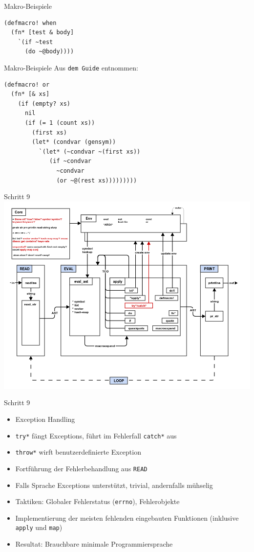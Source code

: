 \documentclass[presentation]{beamer}
\begin{document}
\begin{frame}[fragile,label=sec-3-26]{Makro-Beispiele}
 \begin{verbatim}
(defmacro! when
  (fn* [test & body]
    `(if ~test
      (do ~@body))))
\end{verbatim}
\end{frame}

\begin{frame}[fragile,label=sec-3-27]{Makro-Beispiele}
 Aus \texttt{dem Guide} entnommen:

\begin{verbatim}
(defmacro! or
  (fn* [& xs]
    (if (empty? xs)
      nil
      (if (= 1 (count xs))
        (first xs)
        (let* (condvar (gensym))
          `(let* (~condvar ~(first xs))
             (if ~condvar
               ~condvar
               (or ~@(rest xs)))))))))
\end{verbatim}
\end{frame}

\begin{frame}[label=sec-3-28]{Schritt 9}
\includegraphics[width=.9\linewidth]{./images/step9_try.png}
\end{frame}

\begin{frame}[fragile,label=sec-3-29]{Schritt 9}
 \begin{itemize}
\item Exception Handling
\item \texttt{try*} fängt Exceptions, führt im Fehlerfall \texttt{catch*} aus
\item \texttt{throw*} wirft benutzerdefinierte Exception
\item Fortführung der Fehlerbehandlung aus \texttt{READ}
\item Falls Sprache Exceptions unterstützt, trivial, andernfalls mühselig
\item Taktiken: Globaler Fehlerstatus (\texttt{errno}), Fehlerobjekte
\item Implementierung der meisten fehlenden eingebauten Funktionen
(inklusive \texttt{apply} und \texttt{map})
\item Resultat: Brauchbare minimale Programmiersprache
\end{itemize}
\end{frame}
\end{document}
